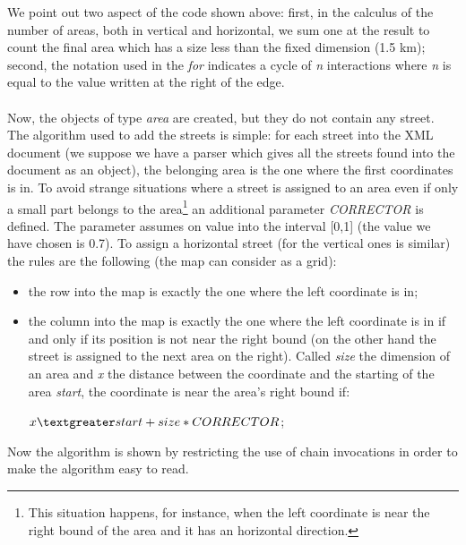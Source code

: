 \documentclass[\mainpath/main]{subfiles}
\begin{document}
We point out two aspect of the code shown above: first, in the calculus of the number of areas, both in vertical and horizontal, we sum one at the result to count the final area which has a size less than the fixed dimension (1.5 km); second, the notation used in the \textit{for} indicates a cycle of \textit{n} interactions where \textit{n} is equal to the value written at the right of the edge.\\
\\
Now, the objects of type \textit{area} are created, but they do not contain any street. The algorithm used to add the streets is simple: for each street into the XML document (we suppose we have a parser which gives all the streets found into the document as an object), the belonging area is the one where the first coordinates is in. To avoid strange situations where a street is assigned to an area even if only a small part belongs to the area\footnote{This situation happens, for instance, when the left coordinate is near the right bound of the area and it has an horizontal direction.} an additional parameter \textit{CORRECTOR} is defined. The parameter assumes on value into the interval [0,1] (the value we have chosen is 0.7). To assign a horizontal street (for the vertical ones is similar) the rules are the following (the map can consider as a grid):
\begin{itemize}
	\item the row into the map is exactly the one where the left coordinate is in;
	\item the column into the map is exactly the one where the left coordinate is in if and only if its position is not near the right bound (on the other hand the street is assigned to the next area on the right). Called \textit{size} the dimension of an area and \textit{x} the distance between the coordinate and the starting of the area \textit{start}, the coordinate is near the area's right bound if:
	\begin{center}
		$ x \textgreater start + size * CORRECTOR $;
	\end{center}
\end{itemize}
Now the algorithm is shown by restricting the use of chain invocations in order to make the algorithm easy to read.\\
\end{document}
